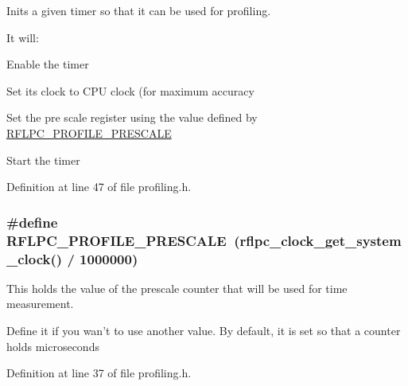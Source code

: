 Inits a given timer so that it can be used for profiling. 

It will\-:
\begin{DoxyItemize}
\item Enable the timer
\item Set its clock to C\-P\-U clock (for maximum accuracy
\item Set the pre scale register using the value defined by \hyperlink{group__debug_gade638bd8e832b7cb23d79221bdd672b3}{R\-F\-L\-P\-C\-\_\-\-P\-R\-O\-F\-I\-L\-E\-\_\-\-P\-R\-E\-S\-C\-A\-L\-E}
\item Start the timer 
\end{DoxyItemize}

Definition at line 47 of file profiling.\-h.

\hypertarget{group__debug_gade638bd8e832b7cb23d79221bdd672b3}{
\subsubsection[{R\-F\-L\-P\-C\-\_\-\-P\-R\-O\-F\-I\-L\-E\-\_\-\-P\-R\-E\-S\-C\-A\-L\-E}]{\setlength{\rightskip}{0pt plus 5cm}\#define {\bf R\-F\-L\-P\-C\-\_\-\-P\-R\-O\-F\-I\-L\-E\-\_\-\-P\-R\-E\-S\-C\-A\-L\-E}~({\bf rflpc\-\_\-clock\-\_\-get\-\_\-system\-\_\-clock}() / 1000000)}}\label{group__debug_gade638bd8e832b7cb23d79221bdd672b3}


This holds the value of the prescale counter that will be used for time measurement. 

Define it if you wan't to use another value. By default, it is set so that a counter holds microseconds 

Definition at line 37 of file profiling.\-h.

